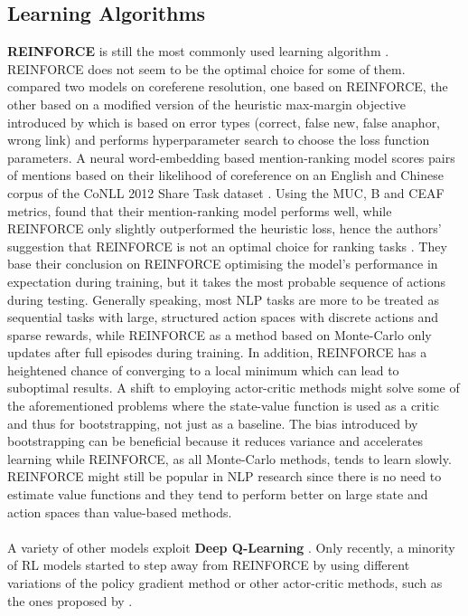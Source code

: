 \documentclass[11pt,a4paper]{article}
\begin{document}
\subsection{Learning Algorithms}
\textbf{REINFORCE} is still the most commonly used learning algorithm \citep{yasui-etal-2019, zhang-2018, hu-etal-2018-playing, godin-etal-2019-learning, huang-etal-2018-neural, mao-etal-2018-end, ranzato2015sequence, wu-etal-2018-study, clark-manning-2016-deep,yogatama-2017, guu-etal-2017-language, zeng-2018}. REINFORCE does not seem to be the optimal choice for some of them. \citet{clark-manning-2016-deep} compared two models on coreferene resolution, one based on REINFORCE, the other based on a modified version of the heuristic max-margin objective introduced by \citep{wiseman-etal-2015-learning} which is based on error types (correct, false new, false anaphor, wrong link) and performs hyperparameter search to choose the loss function parameters. A neural word-embedding based mention-ranking model scores pairs of mentions based on their likelihood of coreference on an English and Chinese corpus of the CoNLL 2012 Share Task dataset \citet{conll-2012}. Using the MUC, B and CEAF metrics, \citet{clark-manning-2016-deep} found that their mention-ranking model performs well, while REINFORCE only slightly outperformed the heuristic loss, hence the authors' suggestion that REINFORCE is not an optimal choice for ranking tasks \citet{grishman-sundheim-1996-message, cai-strube-2010-evaluation}. They base their conclusion on REINFORCE optimising the model's performance in expectation during training, but it takes the most probable sequence of actions during testing. Generally speaking, most NLP tasks are more to be treated as sequential tasks with large, structured action spaces with discrete actions and sparse rewards, while REINFORCE as a method based on Monte-Carlo only updates after full episodes during training. In addition, REINFORCE has a heightened chance of converging to a local minimum which can lead to suboptimal results. A shift to employing actor-critic methods might solve some of the aforementioned problems where the state-value function is used as a critic and thus for bootstrapping, not just as a baseline. The bias introduced by bootstrapping can be beneficial because it reduces variance and accelerates learning while REINFORCE, as all Monte-Carlo methods, tends to learn slowly. REINFORCE might still be popular in NLP research since there is no need to estimate value functions and they tend to perform better on large state and action spaces than value-based methods. \\\\
A variety of other models exploit \textbf{Deep Q-Learning} \citep{narasimhan-etal-2016-improving, mosallanezhad-etal-2019-deep, ling-etal-2017-learning}. Only recently, a minority of RL models started to step away from REINFORCE by using different variations of the policy gradient method \citep{branavan-2009, li-etal-2018-paraphrase, li-etal-2016-deep, le-fokkens-2017-tackling} or other actor-critic methods, such as the ones proposed by \citet{dethlefs-cuayahuitl-2011,grissom-ii-etal-2014-dont, he-etal-2016-deep-reinforcement, chen-bansal-2018-fast, goyal-2019}. 
\end{document}
